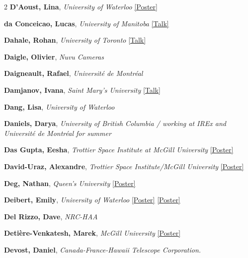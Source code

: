 \begin{small}
\begin{multicols}{2}
\textbf{D'Aoust, Lina}, {\footnotesize\textit{University of Waterloo}} \hyperref[poster-abstract-page-talk-261]{\scriptsize\textcolor{cascateal}{[Poster]}}\par
\textbf{da Conceicao, Lucas}, {\footnotesize\textit{University of Manitoba}} \hyperref[abstract-page-talk-283]{\scriptsize\textcolor{cascablue}{[Talk]}}\par
\textbf{Dahale, Rohan}, {\footnotesize\textit{University of Toronto}} \hyperref[abstract-page-talk-19]{\scriptsize\textcolor{cascablue}{[Talk]}}\par
\textbf{Daigle, Olivier}, {\footnotesize\textit{Nuvu Cameras}}\par
\textbf{Daigneault, Rafael}, {\footnotesize\textit{Université de Montréal}}\par
\textbf{Damjanov, Ivana}, {\footnotesize\textit{Saint Mary's University}} \hyperref[abstract-page-talk-329]{\scriptsize\textcolor{cascablue}{[Talk]}}\par
\textbf{Dang, Lisa}, {\footnotesize\textit{University of Waterloo}}\par
\textbf{Daniels, Darya}, {\footnotesize\textit{University of British Columbia / working at IREx and Université de Montréal for summer}}\par
\textbf{Das Gupta, Eesha}, {\footnotesize\textit{Trottier Space Institute at McGill University}} \hyperref[poster-abstract-page-talk-109]{\scriptsize\textcolor{cascateal}{[Poster]}}\par
\textbf{David-Uraz, Alexandre}, {\footnotesize\textit{Trottier Space Institute/McGill University}} \hyperref[poster-abstract-page-talk-220]{\scriptsize\textcolor{cascateal}{[Poster]}}\par
\textbf{Deg, Nathan}, {\footnotesize\textit{Queen's University}} \hyperref[poster-abstract-page-talk-45]{\scriptsize\textcolor{cascateal}{[Poster]}}\par
\textbf{Deibert, Emily}, {\footnotesize\textit{University of Waterloo}} \hyperref[poster-abstract-page-talk-32]{\scriptsize\textcolor{cascateal}{[Poster]}} \hyperref[poster-abstract-page-talk-104]{\scriptsize\textcolor{cascateal}{[Poster]}}\par
\textbf{Del Rizzo, Dave}, {\footnotesize\textit{NRC-HAA}}\par
\textbf{Detière-Venkatesh, Marek}, {\footnotesize\textit{McGill University}} \hyperref[poster-abstract-page-talk-162]{\scriptsize\textcolor{cascateal}{[Poster]}}\par
\textbf{Devost, Daniel}, {\footnotesize\textit{Canada-France-Hawaii Telescope Corporation.}}\par

\end{multicols}
\end{small}
